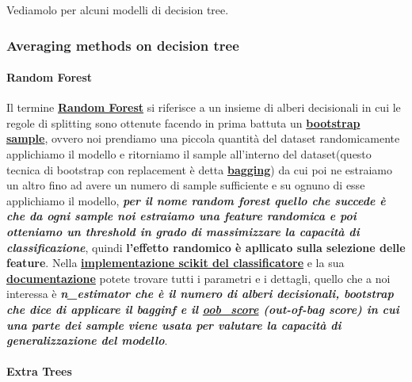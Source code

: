 \documentclass[11pt]{article}
\begin{document}
Vediamolo per alcuni modelli di decision tree.

\hypertarget{averaging-methods-on-decision-tree}{%
\subsubsection{Averaging methods on decision
tree}\label{averaging-methods-on-decision-tree}}

\hypertarget{random-forest}{%
\paragraph{Random Forest}\label{random-forest}}

Il termine
\textbf{\href{https://en.wikipedia.org/wiki/Random_forest}{Random
Forest}} si riferisce a un insieme di alberi decisionali in cui le
regole di splitting sono ottenute facendo in prima battuta un
\textbf{\href{https://www.analyticsvidhya.com/blog/2020/02/what-is-bootstrap-sampling-in-statistics-and-machine-learning/}{bootstrap
sample}}, ovvero noi prendiamo una piccola quantità del dataset
randomicamente applichiamo il modello e ritorniamo il sample all'interno
del dataset(questo tecnica di bootstrap con replacement è detta
\textbf{\href{https://en.wikipedia.org/wiki/Bootstrap_aggregating}{bagging}})
da cui poi ne estraiamo un altro fino ad avere un numero di sample
sufficiente e su ognuno di esse applichiamo il modello,
\textbf{\emph{per il nome random forest quello che succede è che da ogni
sample noi estraiamo una feature randomica e poi otteniamo un threshold
in grado di massimizzare la capacità di classificazione}}, quindi
\textbf{l'effetto randomico è apllicato sulla selezione delle feature}.
Nella
\textbf{\href{https://scikit-learn.org/stable/modules/generated/sklearn.ensemble.RandomForestClassifier.html\#sklearn.ensemble.RandomForestClassifier}{implementazione
scikit del classificatore}} e la sua
\textbf{\href{https://scikit-learn.org/stable/modules/ensemble.html\#forests-of-randomized-trees}{documentazione}}
potete trovare tutti i parametri e i dettagli, quello che a noi
interessa è \textbf{\emph{n\_estimator che è il numero di alberi
decisionali, bootstrap che dice di applicare il bagginf e il
\textbf{\href{https://en.wikipedia.org/wiki/Out-of-bag_error}{oob\_score}}
(out-of-bag score) in cui una parte dei sample viene usata per valutare
la capacità di generalizzazione del modello}}.

\hypertarget{extra-trees}{%
\paragraph{Extra Trees}\label{extra-trees}}
\end{document}
